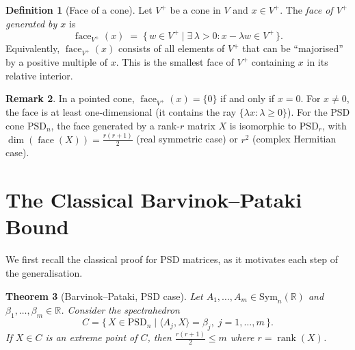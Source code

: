 \documentclass[11pt,a4paper]{article}
\newtheorem{theorem}{Theorem}
\theoremstyle{definition}
\newtheorem{definition}[theorem]{Definition}
\newtheorem{remark}[theorem]{Remark}
\newcommand{\R}{\mathbb{R}}
\newcommand{\face}{\operatorname{face}}
\newcommand{\rank}{\operatorname{rank}}
\newcommand{\PSD}{\mathrm{PSD}}
\newcommand{\Sym}{\mathrm{Sym}}
\begin{document}
\begin{definition}[Face of a cone]\label{def:face}
Let $V^+$ be a cone in $V$ and $x \in V^+$.  The \emph{face of $V^+$
generated by $x$} is
\[
  \face_{V^+}(x)
  \;=\;
  \bigl\{\, w \in V^+ \;\big|\;
    \exists\, \lambda > 0 \colon x - \lambda w \in V^+ \,\bigr\}.
\]
Equivalently, $\face_{V^+}(x)$ consists of all elements of $V^+$ that
can be ``majorised'' by a positive multiple of $x$.  This is the
smallest face of $V^+$ containing $x$ in its relative interior.
\end{definition}

\begin{remark}
In a pointed cone, $\face_{V^+}(x) = \{0\}$ if and only if $x = 0$.
For $x \neq 0$, the face is at least one-dimensional (it contains
the ray $\{\lambda x : \lambda \geq 0\}$).  For the PSD cone
$\PSD_n$, the face generated by a rank-$r$ matrix $X$ is
isomorphic to $\PSD_r$, with
$\dim(\face(X)) = \frac{r(r+1)}{2}$ (real symmetric case) or
$r^2$ (complex Hermitian case).
\end{remark}

\section{The Classical Barvinok--Pataki Bound}

We first recall the classical proof for PSD matrices, as it motivates
each step of the generalisation.

\begin{theorem}[Barvinok--Pataki, PSD case]\label{thm:classical}
Let $A_1, \dots, A_m \in \Sym_n(\R)$ and $\beta_1, \dots, \beta_m \in \R$.
Consider the spectrahedron
\[
  C = \bigl\{\, X \in \PSD_n \;\big|\;
    \langle A_j, X \rangle = \beta_j,\; j = 1, \dots, m \,\bigr\}.
\]
If $X \in C$ is an extreme point of $C$, then
$\frac{r(r+1)}{2} \leq m$ where $r = \rank(X)$.
\end{theorem}
\end{document}
